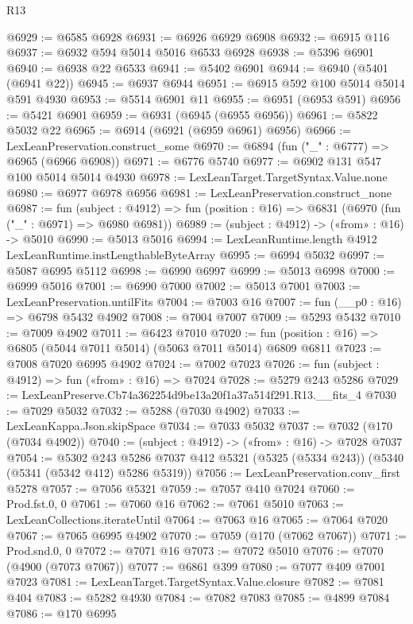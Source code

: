 \begin{lexlean}{R13}
\begin{coremodule}
@6929 := @6585 @6928
@6931 := @6926 @6929 @6908
@6932 := @6915 @116
@6937 := @6932 @594 @5014 @5016 @6533 @6928
@6938 := @5396 @6901
@6940 := @6938 @22 @6533
@6941 := @5402 @6901
@6944 := @6940 (@5401 (@6941 @22))
@6945 := @6937 @6944
@6951 := @6915 @592 @100 @5014 @5014 @591 @4930
@6953 := @5514 @6901 @11
@6955 := @6951 (@6953 @591)
@6956 := @5421 @6901
@6959 := @6931 (@6945 (@6955 @6956))
@6961 := @5822 @5032 @22
@6965 := @6914 (@6921 (@6959 @6961) @6956)
@6966 := LexLeanPreservation.construct_some
@6970 := @6894 (fun ("_" : @6777) => @6965 (@6966 @6908))
@6971 := @6776 @5740
@6977 := @6902 @131 @547 @100 @5014 @5014 @4930
@6978 := LexLeanTarget.TargetSyntax.Value.none
@6980 := @6977 @6978 @6956
@6981 := LexLeanPreservation.construct_none
@6987 := fun (subject : @4912) =>
  fun (position : @16) => @6831 (@6970 (fun ("_" : @6971) => @6980 @6981))
@6989 := (subject : @4912) -> («from» : @16) -> @5010
@6990 := @5013 @5016
@6994 := LexLeanRuntime.length @4912 LexLeanRuntime.instLengthableByteArray
@6995 := @6994 @5032
@6997 := @5087 @6995 @5112
@6998 := @6990 @6997
@6999 := @5013 @6998
@7000 := @6999 @5016
@7001 := @6990 @7000
@7002 := @5013 @7001
@7003 := LexLeanPreservation.untilFits
@7004 := @7003 @16
@7007 := fun (__p0 : @16) => @6798 @5432 @4902
@7008 := @7004 @7007
@7009 := @5293 @5432
@7010 := @7009 @4902
@7011 := @6423 @7010
@7020 := fun (position : @16) => @6805 (@5044 @7011 @5014) (@5063 @7011 @5014) @6809 @6811
@7023 := @7008 @7020 @6995 @4902
@7024 := @7002 @7023
@7026 := fun (subject : @4912) => fun («from» : @16) => @7024
@7028 := @5279 @243 @5286
@7029 := LexLeanPreserve.Cb74a362254d9be13a20f1a37a514f291.R13.__fits_4
@7030 := @7029 @5032
@7032 := @5288 (@7030 @4902)
@7033 := LexLeanKappa.Json.skipSpace
@7034 := @7033 @5032
@7037 := @7032 (@170 (@7034 @4902))
@7040 := (subject : @4912) -> («from» : @16) -> @7028 @7037
@7054 := @5302
    @243
    @5286
    @7037
    @412
    @5321
    (@5325 (@5334 @243))
    (@5340 (@5341 (@5342 @412) @5286 @5319))
@7056 := LexLeanPreservation.conv_first @5278
@7057 := @7056 @5321
@7059 := @7057 @410 @7024
@7060 := Prod.fst.{0, 0}
@7061 := @7060 @16
@7062 := @7061 @5010
@7063 := LexLeanCollections.iterateUntil
@7064 := @7063 @16
@7065 := @7064 @7020
@7067 := @7065 @6995 @4902
@7070 := @7059 (@170 (@7062 @7067))
@7071 := Prod.snd.{0, 0}
@7072 := @7071 @16
@7073 := @7072 @5010
@7076 := @7070 (@4900 (@7073 @7067))
@7077 := @6861 @399
@7080 := @7077 @409 @7001 @7023
@7081 := LexLeanTarget.TargetSyntax.Value.closure
@7082 := @7081 @404
@7083 := @5282 @4930
@7084 := @7082 @7083
@7085 := @4899 @7084
@7086 := @170 @6995

\end{coremodule}
\end{lexlean}
